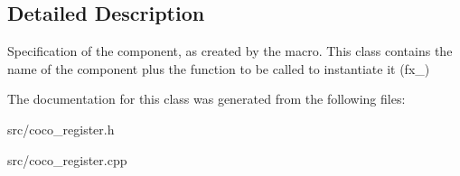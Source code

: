 \subsection{Detailed Description}
Specification of the component, as created by the macro. This class contains the name of the component plus the function to be called to instantiate it (fx\+\_\+) 

The documentation for this class was generated from the following files\+:\begin{DoxyCompactItemize}
\item 
src/coco\+\_\+register.\+h\item 
src/coco\+\_\+register.\+cpp\end{DoxyCompactItemize}
